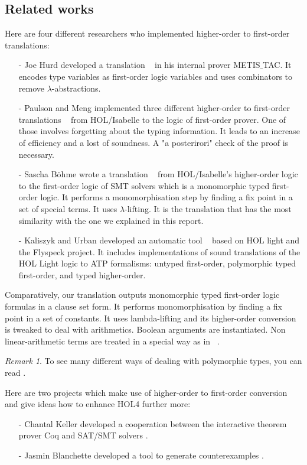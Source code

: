 \documentclass[a4paper, 11pt]{article}
\theoremstyle{plain}
\theoremstyle{definition}
\theoremstyle{remark}
\newtheorem*{remark}{Remark}
\begin{document}
\subsection{Related works}
Here are four different researchers who implemented higher-order to first-order translations:
\begin{enumerate}
\item [-] Joe Hurd developed a translation ~\cite{Hurd03} in his internal prover METIS$\_$TAC. It encodes type variables as first-order logic variables and uses combinators to remove $\lambda$-abstractions. 
\item [-]  Paulson and Meng implemented three different higher-order to first-order translations ~\cite{MengP08} from HOL/Isabelle to the logic of first-order prover.  One of those involves forgetting about the typing information. It leads to an increase of efficiency and a lost of soundness. A "a posterirori" check of the proof is necessary.
\item [-]  Sascha B\"ohme wrote a translation ~\cite{Bohme12} from HOL/Isabelle’s higher-order logic to the first-order logic of SMT solvers which is a monomorphic typed first-order logic.  It performs a monomorphisation step by finding a fix point in a set of special terms. It uses $\lambda$-lifting. It is the translation that has the most similarity with the one we explained in this report.
\item [-] Kaliszyk and Urban developed an automatic tool ~\cite{KaliszykU12} based on HOL light and the Flyspeck project. It includes implementations of sound translations of the HOL Light logic to ATP formalisms: untyped first-order, polymorphic typed first-order, and typed higher-order.
\end{enumerate} 

\noindent Comparatively, our translation outputs monomorphic typed first-order logic formulas in a clause set form. It performs monomorphisation by finding a fix point in a set of constants. It uses lambda-lifting and its higher-order conversion is tweaked to deal with arithmetics. Boolean arguments are instantiated. Non linear-arithmetic terms are treated in a special way as in ~\cite{Bohme12}.

\begin{remark}
To see many different ways of dealing with polymorphic types, you can read \cite{BlanchetteBPS13}.
\end{remark}

\noindent Here are two projects which make use of higher-order to first-order conversion and  give ideas how to enhance HOL4 further more:
\begin{enumerate}
\item [-] Chantal Keller developed a cooperation between the interactive theorem prover Coq and SAT/SMT solvers \cite{Keller13}.
\item [-] Jasmin Blanchette developed a tool to generate counterexamples \cite{Blanchette12}. 

\end{enumerate}
\end{document}
